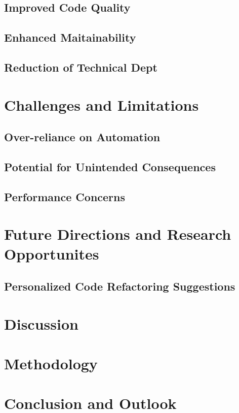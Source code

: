 \documentclass[conference]{IEEEtran}
\begin{document}
\subsection{Improved Code Quality}
\subsection{Enhanced Maitainability}
\subsection{Reduction of Technical Dept}

\section{Challenges and Limitations}
\subsection{Over-reliance on Automation}
\subsection{Potential for Unintended Consequences}
\subsection{Performance Concerns}

\section{Future Directions and Research Opportunites}
\subsection{Personalized Code Refactoring Suggestions}
\section{Discussion}


\section{Methodology}

\section{Conclusion and Outlook}

\nocite{*} %
\end{document}
